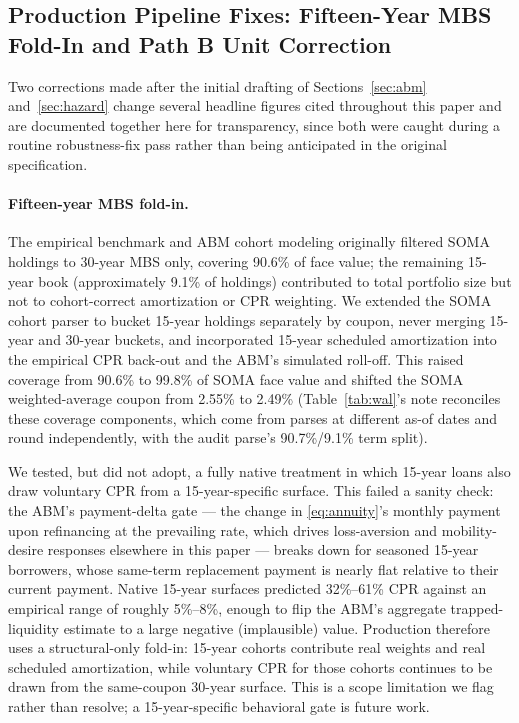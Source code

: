 \documentclass[12pt]{article}
\begin{document}
\subsection{Production Pipeline Fixes: Fifteen-Year MBS Fold-In and Path B Unit Correction}\label{sec:robustness-pipeline}

Two corrections made after the initial drafting of Sections~\ref{sec:abm} and~\ref{sec:hazard} change several headline figures cited throughout this paper and are documented together here for transparency, since both were caught during a routine robustness-fix pass rather than being anticipated in the original specification.

\paragraph{Fifteen-year MBS fold-in.} The empirical benchmark and ABM cohort modeling originally filtered SOMA holdings to 30-year MBS only, covering 90.6\% of face value; the remaining 15-year book (approximately 9.1\% of holdings) contributed to total portfolio size but not to cohort-correct amortization or CPR weighting. We extended the SOMA cohort parser to bucket 15-year holdings separately by coupon, never merging 15-year and 30-year buckets, and incorporated 15-year scheduled amortization into the empirical CPR back-out and the ABM's simulated roll-off. This raised coverage from 90.6\% to 99.8\% of SOMA face value and shifted the SOMA weighted-average coupon from 2.55\% to 2.49\% (Table~\ref{tab:wal}'s note reconciles these coverage components, which come from parses at different as-of dates and round independently, with the audit parse's 90.7\%/9.1\% term split).

We tested, but did not adopt, a fully native treatment in which 15-year loans also draw voluntary CPR from a 15-year-specific surface. This failed a sanity check: the ABM's payment-delta gate --- the change in \eqref{eq:annuity}'s monthly payment upon refinancing at the prevailing rate, which drives loss-aversion and mobility-desire responses elsewhere in this paper --- breaks down for seasoned 15-year borrowers, whose same-term replacement payment is nearly flat relative to their current payment. Native 15-year surfaces predicted 32\%--61\% CPR against an empirical range of roughly 5\%--8\%, enough to flip the ABM's aggregate trapped-liquidity estimate to a large negative (implausible) value. Production therefore uses a structural-only fold-in: 15-year cohorts contribute real weights and real scheduled amortization, while voluntary CPR for those cohorts continues to be drawn from the same-coupon 30-year surface. This is a scope limitation we flag rather than resolve; a 15-year-specific behavioral gate is future work.
\end{document}

